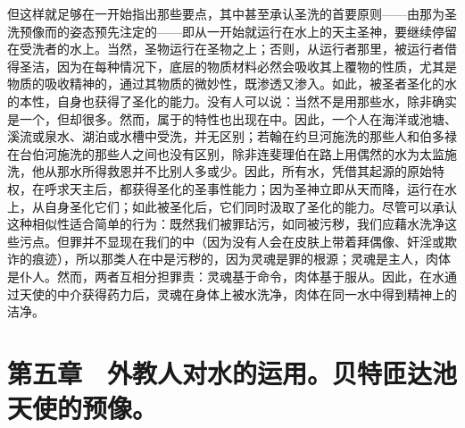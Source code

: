 但这样就足够在一开始指出那些要点，其中甚至承认圣洗的首要原则——由那为圣洗预像而的姿态预先注定的——即从一开始就运行在水上的天主圣神，要继续停留在受洗者的水上。当然，圣物运行在圣物之上；否则，从运行者那里，被运行者借得圣洁，因为在每种情况下，底层的物质材料必然会吸收其上覆物的性质，尤其是物质的吸收精神的，通过其物质的微妙性，既渗透又渗入。如此，被圣者圣化的水的本性，自身也获得了圣化的能力。没有人可以说：当然不是用那些水，除非确实是一个，但却很多。然而，属于的特性也出现在中。因此，一个人在海洋或池塘、溪流或泉水、湖泊或水槽中受洗，并无区别；若翰在约旦河施洗的那些人和伯多禄在台伯河施洗的那些人之间也没有区别，除非连斐理伯在路上用偶然的水为太监施洗，他从那水所得救恩并不比别人多或少。因此，所有水，凭借其起源的原始特权，在呼求天主后，都获得圣化的圣事性能力；因为圣神立即从天而降，运行在水上，从自身圣化它们；如此被圣化后，它们同时汲取了圣化的能力。尽管可以承认这种相似性适合简单的行为：既然我们被罪玷污，如同被污秽，我们应藉水洗净这些污点。但罪并不显现在我们的中（因为没有人会在皮肤上带着拜偶像、奸淫或欺诈的痕迹），所以那类人在中是污秽的，因为灵魂是罪的根源；灵魂是主人，肉体是仆人。然而，两者互相分担罪责：灵魂基于命令，肉体基于服从。因此，在水通过天使的中介获得药力后，灵魂在身体上被水洗净，肉体在同一水中得到精神上的洁净。\par


\section{第五章　外教人对水的运用。贝特匝达池天使的预像。}

